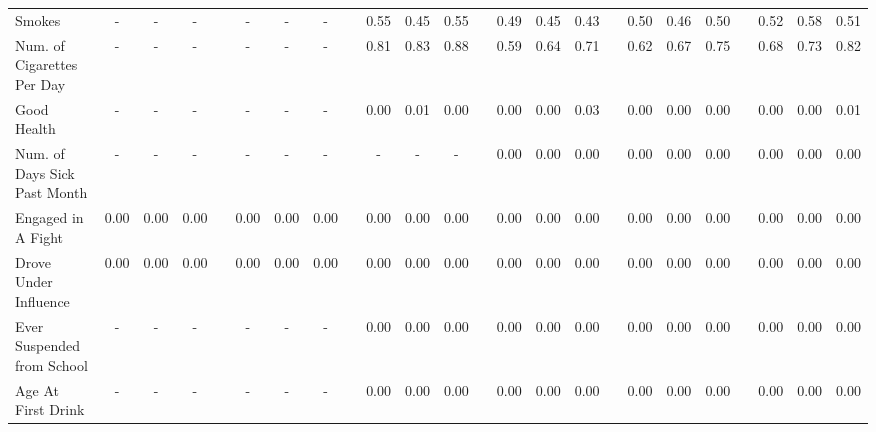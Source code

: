 \begin{center}
{\begin{longtable}{L{12em} c c c p{1.2em} c c c p{1.2em} c c c p{1.2em} c c c p{1.2em} c c c p{1.2em} c c c}
Smokes & - & - & - & & - & - & - & &      0.55 &      0.45 &      0.55 & &      0.49 &      0.45 &      0.43 & &      0.50 &      0.46 &      0.50 & &      0.52 &      0.58 &      0.51 \\[.3em]
Num. of Cigarettes Per Day & - & - & - & & - & - & - & &      0.81 &      0.83 &      0.88 & &      0.59 &      0.64 &      0.71 & &      0.62 &      0.67 &      0.75 & &      0.68 &      0.73 &      0.82 \\[.3em]
Good Health & - & - & - & & - & - & - & &      0.00 &      0.01 &      0.00 & &      0.00 &      0.00 &      0.03 & &      0.00 &      0.00 &      0.00 & &      0.00 &      0.00 &      0.01 \\[.3em]
Num. of Days Sick Past Month & - & - & - & & - & - & - & & - & - & - & &      0.00 &      0.00 &      0.00 & &      0.00 &      0.00 &      0.00 & &      0.00 &      0.00 &      0.00 \\[.3em]
Engaged in A Fight & 0.00 &      0.00 &      0.00 & &      0.00 &      0.00 &      0.00 & &      0.00 &      0.00 &      0.00 & &      0.00 &      0.00 &      0.00 & &      0.00 &      0.00 &      0.00 & &      0.00 &      0.00 &      0.00 \\[.3em]
Drove Under Influence & 0.00 &      0.00 &      0.00 & &      0.00 &      0.00 &      0.00 & &      0.00 &      0.00 &      0.00 & &      0.00 &      0.00 &      0.00 & &      0.00 &      0.00 &      0.00 & &      0.00 &      0.00 &      0.00 \\[.3em]
Ever Suspended from School & - & - & - & & - & - & - & &      0.00 &      0.00 &      0.00 & &      0.00 &      0.00 &      0.00 & &      0.00 &      0.00 &      0.00 & &      0.00 &      0.00 &      0.00 \\[.3em]
Age At First Drink & - & - & - & & - & - & - & &      0.00 &      0.00 &      0.00 & &      0.00 &      0.00 &      0.00 & &      0.00 &      0.00 &      0.00 & &      0.00 &      0.00 &      0.00 \\[.3em]
\hline
\end{longtable}
}
\end{center}
